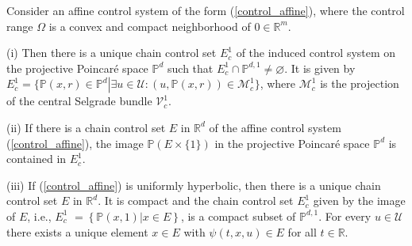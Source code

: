 	\begin{theorem}
		\label{Theorem_E}Consider an affine control system of the form
		(\ref{control_affine}), where the control range $\Omega$ is a convex and
		compact neighborhood of $0\in\mathbb{R}^{m}$.
		
		(i) Then there is a unique chain control set $E_{c}^{1}$ of the induced
		control system on the projective Poincar\'{e} space $\mathbb{P}^{d}$ such that
		$E_{c}^{1}\cap\mathbb{P}^{d,1}\not =\varnothing$. It is given by $E_{c}%
		^{1}=\{\mathbb{P}(x,r)\in\mathbb{P}^{d}\left\vert \exists u\in\mathcal{U}%
		:(u,\mathbb{P}(x,r))\in\mathcal{M}_{c}^{1}\right.  \}$, where $\mathcal{M}%
		_{c}^{1}$ is the projection of the central Selgrade bundle $\mathcal{V}%
		_{c}^{1}$.
		
		(ii) If there is a chain control set $E$ in $\mathbb{R}^{d}$ of the affine
		control system (\ref{control_affine}), the image $\mathbb{P}\left(
		E\times\{1\}\right)  $ in the projective Poincar\'{e} space $\mathbb{P}^{d}$
		is contained in $E_{c}^{1}$.
		
		(iii) If (\ref{control_affine}) is uniformly hyperbolic, then there is a
		unique chain control set $E$ in $\mathbb{R}^{d}$. It is compact and the chain
		control set $E_{c}^{1}$ given by the image of $E$, i.e., $E_{c}^{1}$
		$=\left\{  \mathbb{P}\left(  x,1\right)  \left\vert x\in E\right.  \right\}
		$, is a compact subset of $\mathbb{P}^{d,1}$. For every $u\in\mathcal{U}$
		there exists a unique element $x\in E$ with $\psi(t,x,u)\in E$ for all
		$t\in\mathbb{R}$.
	\end{theorem}
	
